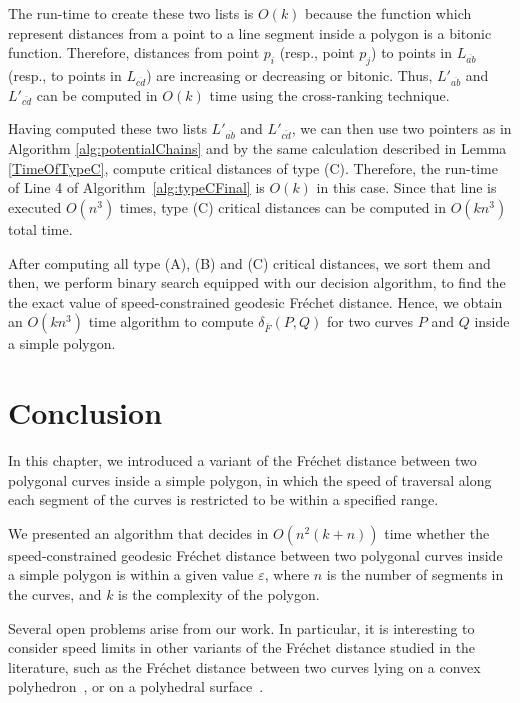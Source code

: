 \documentclass[12pt]{dalthesis}
\def\favoritefont{\bfseries \sffamily}
\def\QED{\ensuremath{{\Box}}}
\def\markatright#1{\leavevmode\unskip\nobreak\quad\hspace*{\fill}{#1}}
\newenvironment{proof}
	{\begin{trivlist}\item[\hskip\labelsep{\favoritefont Proof:}]}
	{\markatright{\QED}\end{trivlist}}
\newcommand{\eps}{\varepsilon}
\newcommand{\CF}{{\mathscr F}}
\newcommand{\Frechet}{Fr\'echet }
\newcommand{\distFS}{\delta_{\bar{F}}} \newcommand{\distWeakF}{\delta_{\bar{N}}} \newcommand{\distClosedF}{\delta_{\bar{C}}} \newcommand{\distPartialF}{\delta_{\bar{P}}} \newcommand{\distGrpahF}{\delta_{\bar{G}}} \newcommand{\distDisF}{\delta_{dF}} \newcommand{\distGeoF}{\delta_{\hat{F}}} \newcommand{\distHomF}{\delta_{h}} \newcommand{\distC}{\delta_C} \newcommand{\distSetF}{\delta_{\CF}}
\newcommand{\Seg}[1]{{\overline{#1}}}
\begin{document}
\begin{proof}
The run-time to create these two lists is $O(k)$ because
the function which represent distances from a 
point to a line segment inside a polygon is a bitonic function. 
Therefore, distances from point $p_i$ (resp., point $p_j$)  to points in $L_{\Seg{ab}}$ (resp., to points in  $L_{\Seg{cd}}$)
are increasing or decreasing or bitonic. 
Thus, $L'_{\Seg{ab}}$ and $L'_{\Seg{cd}}$ can be computed 
 in $O(k)$ time using the cross-ranking technique. 





Having computed these two lists $L'_{\Seg{ab}}$ and $L'_{\Seg{cd}}$, 
we can then use two pointers as in Algorithm 
\ref{alg:potentialChains} and 
by the same  calculation 
described in Lemma \ref{TimeOfTypeC}, 
compute critical distances of type (C).
Therefore, the run-time of Line 4 of Algorithm~\ref{alg:typeCFinal} 
is $O(k)$ in this case. Since that line is executed 
$O(n^3)$ times, type (C) 
critical distances can be computed in $O(k n^3)$ total time.









After computing all type (A), (B) and (C) critical distances, we sort them 
and then, we perform binary search equipped with our decision algorithm, 
to find the the exact value of 
speed-constrained geodesic \Frechet  distance. 
Hence, we obtain an $O(kn^3)$ time algorithm to compute $\distFS(P,Q)$
for two curves $P$ and $Q$ inside a simple polygon.
\end{proof}





\section{Conclusion}
In this chapter, we introduced a variant of the \Frechet distance between two polygonal curves inside a 
simple polygon,
in which the speed of traversal along each segment of the curves is restricted to be within a specified range.


We presented an algorithm that decides in $O(n^2 (k + n))$ 
time whether the speed-constrained geodesic \Frechet distance between two polygonal curves inside a 
simple polygon is within a given value $\eps$, 
where $n$ is the number of segments in the curves, and $k$ is the complexity of the polygon. 


Several open problems arise from our work.
In particular, it is interesting to consider speed limits in
other variants of the \Frechet distance studied in the literature,
such as the \Frechet distance between two curves lying 
on a convex polyhedron~\cite{AnilFrechet}, or on a polyhedral surface~\cite{Cook2009}. 
\end{document}
